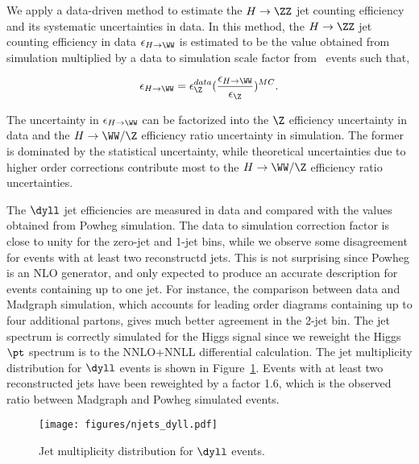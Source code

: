 We apply a data-driven method to estimate the $H \to \ZZ$ jet counting 
efficiency and its systematic uncertainties in data. 
In this method, the $H \to \ZZ$ jet counting efficiency in data $\epsilon_{H \to \WW}$
is estimated to be the value obtained from simulation multiplied by a data to simulation
scale factor from \dyll~events such that,

$$\epsilon_{H \to \WW} = \epsilon_{\Z}^{data} (\frac{\epsilon_{H \to \WW}}{\epsilon_{\Z}})^{MC}.$$

The uncertainty in $\epsilon_{H \to \WW}$ can be factorized into the 
$\Z$ efficiency uncertainty in data and the $H \to \WW/\Z$ efficiency ratio 
uncertainty in simulation. 
The former is dominated by the statistical uncertainty, while 
theoretical uncertainties due to higher order corrections contribute most 
to the $H \to \WW/\Z$ efficiency ratio uncertainties. 

The $\dyll$ jet efficiencies are measured in data and compared with the 
values obtained from Powheg simulation. 
The data to simulation correction factor 
is close to unity for the zero-jet and 1-jet bins, 
while we observe some disagreement for events with at least two reconstructd jets. 
This is not surprising since Powheg is an NLO generator, and 
only expected to produce an accurate description for events 
containing up to one jet. For instance, the comparison between data and Madgraph 
simulation, which accounts for leading order diagrams containing up to four additional
partons, gives much better agreement in the 2-jet bin. 
The jet spectrum is correctly simulated for the Higgs signal since we
reweight the Higgs $\pt$ spectrum is to the NNLO+NNLL differential calculation. 
The jet multiplicity distribution for $\dyll$ events is shown in 
Figure~\ref{fig:njets_dyll}. Events with at least two reconstructed jets have been 
reweighted by a factor 1.6, which is the observed ratio between Madgraph and 
Powheg simulated events.

\begin{figure}[!htbp]
\begin{center}
   \texttt{[image: figures/njets\_dyll.pdf]}
   \caption{Jet multiplicity distribution for $\dyll$ events.}
   \label{fig:njets_dyll}
\end{center}
\end{figure}
